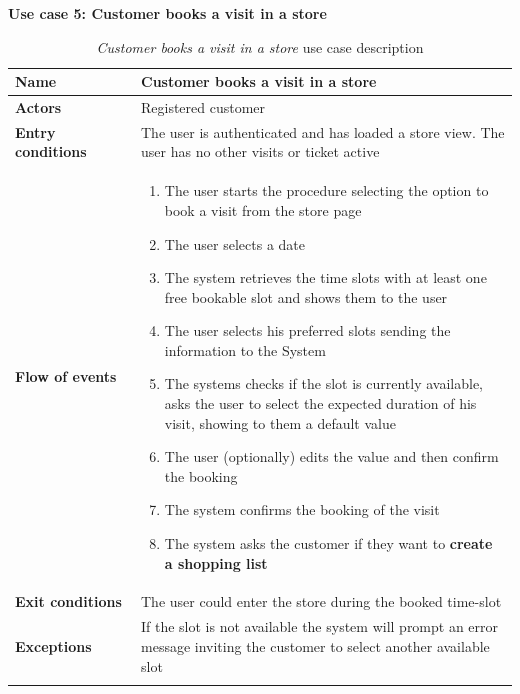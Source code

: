 \clearpage
\textbf{Use case 5: Customer books a visit in a store}
\smallskip
{}
\begin{longtable}{p{0.25\linewidth}p{0.75\linewidth}}
    \toprule
    \textbf{Name}             & \textbf{Customer books a visit in a store}                                                                                  \\
    \midrule
    \textbf{Actors}           & Registered customer                                                                                                         \\
    \midrule
    \textbf{Entry conditions} & The user is authenticated and has loaded a store view. The user has no other visits or ticket active                        \\
    \midrule
    \textbf{Flow of events}   &
    \begin{enumerate}
        \item The user starts the procedure selecting the option to book a visit from the store page
        \item The user selects a date
        \item The system retrieves the time slots with at least one free bookable slot and shows them to the user
        \item The user selects his preferred slots sending the information to the System
        \item The systems checks if the slot is currently available, asks the user to select the expected duration of his visit, showing to them a default value
        \item The user (optionally) edits the value and then confirm the booking
        \item The system confirms the booking of the visit
        \item The system asks the customer if they want to \textbf{create a shopping list}
    \end{enumerate}                                                                                                                              \\
    \midrule
    \textbf{Exit conditions}  & The user could enter the store during the booked time-slot                                                                  \\
    \midrule
    \textbf{Exceptions}       & If the slot is not available the system will prompt an error message inviting the customer to select another available slot \\
    \bottomrule
    \caption{\emph{Customer books a visit in a store} use case description}
\end{longtable}

